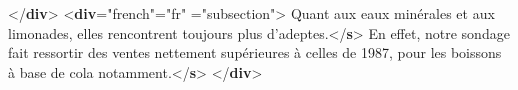 \begin{shaded}
\mbox{}\newline 
{</\textbf{div}>}\mbox{}\newline 
{<\textbf{div}\hspace*{1em}{xml:id}="{french}"\hspace*{1em}{xml:lang}="{fr}"\mbox{}\newline 
\hspace*{1em}{type}="{subsection}">}\mbox{}\newline 
{}\mbox{}\newline 
\hspace*{1em}Quant aux eaux minérales et aux limonades, elles\mbox{}\newline 
\hspace*{1em}\hspace*{1em}\hspace*{1em}\hspace*{1em} rencontrent toujours plus d'adeptes.{</\textbf{s}>}\mbox{}\newline 
\hspace*{1em}En effet, notre sondage fait ressortir des ventes nettement\mbox{}\newline 
\hspace*{1em}\hspace*{1em}\hspace*{1em}\hspace*{1em} supérieures à celles de 1987, pour les boissons à\mbox{}\newline 
\hspace*{1em}\hspace*{1em}\hspace*{1em}\hspace*{1em} base de cola notamment.{</\textbf{s}>}\mbox{}\newline 
{}\mbox{}\newline 
{</\textbf{div}>}\end{shaded}\egroup\par 

